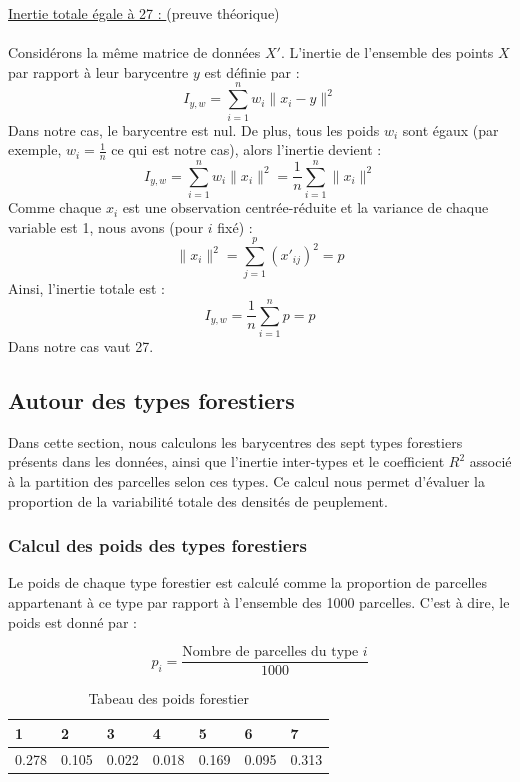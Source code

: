 \documentclass{article}
\begin{document}
\underline{Inertie totale égale à 27 : } (preuve théorique)
\\
\\
Considérons la même matrice de données \(X'\). L'inertie de l'ensemble des points \(X\) par rapport à leur barycentre \(y\) est définie par :
\[
I_{y,w} = \sum_{i=1}^n w_i \|x_i - y\|^2
\]
Dans notre cas, le barycentre est nul. De plus, tous les poids \(w_i\) sont égaux (par exemple, \(w_i = \frac{1}{n}\) ce qui est notre cas), alors l'inertie devient :
\[
I_{y,w} = \sum_{i=1}^n w_i \|x_i\|^2 = \frac{1}{n} \sum_{i=1}^n \|x_i\|^2
\]
Comme chaque \(x_i\) est une observation centrée-réduite et la variance de chaque variable est 1, nous avons (pour \(i\) fixé) :
\[
\|x_i\|^2 = \sum_{j=1}^p (x'_{ij})^2 = p
\]
Ainsi, l'inertie totale est :
\[
I_{y,w} = \frac{1}{n} \sum_{i=1}^n p = p
\]
Dans notre cas vaut 27.

\subsection{Autour des types forestiers}

Dans cette section, nous calculons les barycentres des sept types forestiers présents dans les données, ainsi que l'inertie inter-types et le coefficient $R^2$
 associé à la partition des parcelles selon ces types. Ce calcul nous permet d'évaluer la proportion de la variabilité totale des densités de peuplement.


\subsubsection{Calcul des poids des types forestiers}
Le poids de chaque type forestier est calculé comme la proportion de parcelles appartenant à ce type par rapport à l'ensemble des 1000 parcelles. C'est à dire, le poids est donné par :

\[
p_i = \frac{\text{Nombre de parcelles du type } i}{1000}
\]

\begin{table}[H]
    \center
    \begin{tabular}{|l|l|l|l|l|l|l|}
    \hline
    1     & 2     & 3     & 4     & 5     & 6     & 7     \\ \hline
    0.278 & 0.105 & 0.022 & 0.018 & 0.169 & 0.095 & 0.313 \\ \hline
    \end{tabular}
    \caption{Tabeau des poids forestier}
    \end{table}
\end{document}
